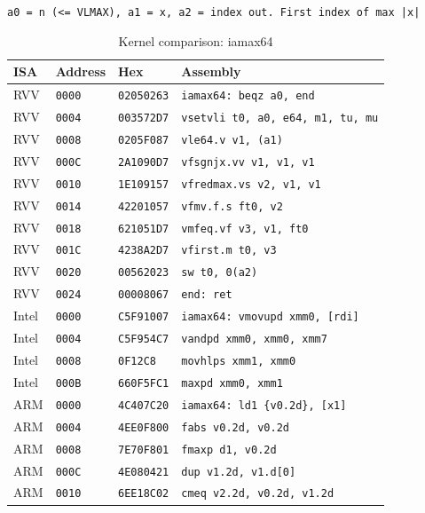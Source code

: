 \begin{table}[htbp]
\centering
\caption{Kernel comparison: iamax64}
\begingroup
\scriptsize
\setlength{\tabcolsep}{4pt}
\noindent \texttt{a0 = n (<= VLMAX), a1 = x, a2 = index out. First index of max |x|}\par
\vspace{0.6ex}
\begin{tabular}{@{}l|l|l|p{7.2cm}@{}}
\toprule
ISA & Address & Hex & Assembly \\
\midrule
RVV & \texttt{0000} & \texttt{02050263} & \texttt{iamax64: beqz a0, end} \\
RVV & \texttt{0004} & \texttt{003572D7} & \texttt{vsetvli t0, a0, e64, m1, tu, mu} \\
RVV & \texttt{0008} & \texttt{0205F087} & \texttt{vle64.v v1, (a1)} \\
RVV & \texttt{000C} & \texttt{2A1090D7} & \texttt{vfsgnjx.vv v1, v1, v1} \\
RVV & \texttt{0010} & \texttt{1E109157} & \texttt{vfredmax.vs v2, v1, v1} \\
RVV & \texttt{0014} & \texttt{42201057} & \texttt{vfmv.f.s ft0, v2} \\
RVV & \texttt{0018} & \texttt{621051D7} & \texttt{vmfeq.vf v3, v1, ft0} \\
RVV & \texttt{001C} & \texttt{4238A2D7} & \texttt{vfirst.m t0, v3} \\
RVV & \texttt{0020} & \texttt{00562023} & \texttt{sw t0, 0(a2)} \\
RVV & \texttt{0024} & \texttt{00008067} & \texttt{end: ret} \\
\midrule
Intel & \texttt{0000} & \texttt{C5F91007} & \texttt{iamax64: vmovupd xmm0, [rdi]} \\
Intel & \texttt{0004} & \texttt{C5F954C7} & \texttt{vandpd xmm0, xmm0, xmm7} \\
Intel & \texttt{0008} & \texttt{0F12C8} & \texttt{movhlps xmm1, xmm0} \\
Intel & \texttt{000B} & \texttt{660F5FC1} & \texttt{maxpd xmm0, xmm1} \\
\midrule
ARM & \texttt{0000} & \texttt{4C407C20} & \texttt{iamax64: ld1 \{v0.2d\}, [x1]} \\
ARM & \texttt{0004} & \texttt{4EE0F800} & \texttt{fabs v0.2d, v0.2d} \\
ARM & \texttt{0008} & \texttt{7E70F801} & \texttt{fmaxp d1, v0.2d} \\
ARM & \texttt{000C} & \texttt{4E080421} & \texttt{dup v1.2d, v1.d[0]} \\
ARM & \texttt{0010} & \texttt{6EE18C02} & \texttt{cmeq v2.2d, v0.2d, v1.2d} \\
\bottomrule
\end{tabular}
\endgroup
\end{table}
\noindent{}\par

